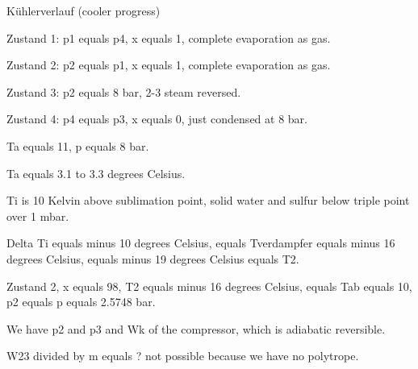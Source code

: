 Kühlerverlauf (cooler progress)

Zustand 1: p1 equals p4, x equals 1, complete evaporation as gas.

Zustand 2: p2 equals p1, x equals 1, complete evaporation as gas.

Zustand 3: p2 equals 8 bar, 2-3 steam reversed.

Zustand 4: p4 equals p3, x equals 0, just condensed at 8 bar.

Ta equals 11, p equals 8 bar.

Ta equals 3.1 to 3.3 degrees Celsius.

Ti is 10 Kelvin above sublimation point, solid water and sulfur below triple point over 1 mbar.

Delta Ti equals minus 10 degrees Celsius, equals Tverdampfer equals minus 16 degrees Celsius, equals minus 19 degrees Celsius equals T2.

Zustand 2, x equals 98, T2 equals minus 16 degrees Celsius, equals Tab equals 10, p2 equals p equals 2.5748 bar.

We have p2 and p3 and Wk of the compressor, which is adiabatic reversible.

W23 divided by m equals ? not possible because we have no polytrope.
